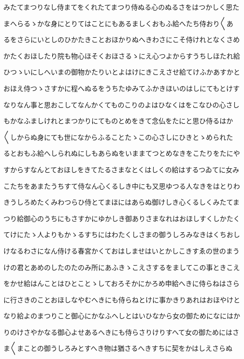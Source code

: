 \documentclass[a4paper,11pt,landscape]{ltjtarticle}
\begin{document}
みたてまつりなし侍まてをくれたてまつり侍ぬる心のぬるさをはつかしく思た
\par\medskip
まへらるゝかな身にとりてはことにもあるましくおもふ給へたち侍おり〱あ
\par\medskip
るをさらにいとしのひかたきことおほかりぬへきわさにこそ侍けれとなくさめ
\par\medskip
かたくおほしたり院も物心ほそくおほさるゝにえ心つよからすうちしほたれ給
\par\medskip
ひつゝいにしへいまの御物かたりいとよはけにきこえさせ給てけふかあすかと
\par\medskip
おほえ侍つゝさすかに程へぬるをうちたゆみてふかきほいのはしにてもとけす
\par\medskip
なりなん事と思おこしてなんかくてものこりのよはひなくはをこなひの心さし
\par\medskip
もかなふましけれとまつかりにてものとめをきて念仏をたにと思ひ侍るはか
\par\medskip
〱しからぬ身にても世になからふることたゝこの心さしにひきとゝめられた
\par\medskip
るとおもふ給へしられぬにしもあらぬをいままてつとめなきをこたりをたにや
\par\medskip
すからすなんとておほしをきてたるさまなとくはしくの給はするつゐてに女み
\par\medskip
こたちをあまたうちすて侍なん心くるしき中にも又思ゆつる人なきをはとりわ
\par\medskip
きうしろめたくみわつらひ侍とてまほにはあらぬ御けしき心くるしくみたてま
\par\medskip
つり給御心のうちにもさすかにゆかしき御ありさまなれはおほしすくしかたく
\par\medskip
てけにたゝ人よりもかゝるすちにはわたくしさまの御うしろみなきはくちおし
\par\medskip
けなるわさになん侍ける春宮かくておはしませはいとかしこきすゑの世のまう
\par\medskip
けの君とあめのしたのたのみ所にあふきゝこえさするをましてこの事ときこえ
\par\medskip
をかせ給はんことはひとことゝしておろそかにかろめ申給へきに侍らねはさら
\par\medskip
に行さきのことおほしなやむへきにも侍らねとけに事かきりあれはおほやけと
\par\medskip
なり給よのまつりこと御心にかなふへしとはいひなから女の御ためになにはか
\par\medskip
りのけさやかなる御心よせあるへきにも侍らさりけりすへて女の御ためにはさ
\par\medskip
ま〱まことの御うしろみとすへき物は猶さるへきすちに契をかはしえさらぬ
\end{document}
